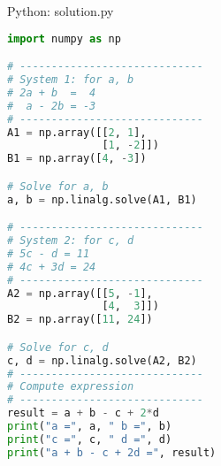\documentclass{beamer}
\numberwithin{equation}{section}
\theoremstyle{remark}
\begin{document}
\begin{frame}[fragile]{Python: solution.py}
\begin{lstlisting}[language=Python]
import numpy as np

# -----------------------------
# System 1: for a, b
# 2a + b  =  4
#  a - 2b = -3
# -----------------------------
A1 = np.array([[2, 1],
               [1, -2]])
B1 = np.array([4, -3])

# Solve for a, b
a, b = np.linalg.solve(A1, B1)

# -----------------------------
# System 2: for c, d
# 5c - d = 11
# 4c + 3d = 24
# -----------------------------
A2 = np.array([[5, -1],
               [4,  3]])
B2 = np.array([11, 24])

# Solve for c, d
c, d = np.linalg.solve(A2, B2)
# -----------------------------
# Compute expression
# -----------------------------
result = a + b - c + 2*d
print("a =", a, " b =", b)
print("c =", c, " d =", d)
print("a + b - c + 2d =", result)

\end{lstlisting}
\end{frame} 
\end{document}
